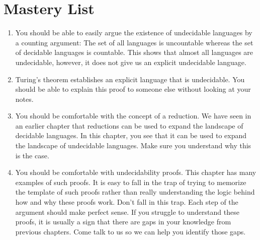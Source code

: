 
\section{Mastery List}

\begin{enumerate}
    \item You should be able to easily argue the existence of undecidable languages by a counting argument: The set of all languages is uncountable whereas the set of decidable languages is countable. This shows that almost all languages are undecidable, however, it does not give us an explicit undecidable language.
    \item Turing's theorem establishes an explicit language that is undecidable. You should be able to explain this proof to someone else without looking at your notes.
    \item You should be comfortable with the concept of a reduction. We have seen in an earlier chapter that reductions can be used to expand the landscape of decidable languages. In this chapter, you see that it can be used to expand the landscape of undecidable languages. Make sure you understand why this is the case.
    \item You should be comfortable with undecidability proofs. This chapter has many examples of such proofs. It is easy to fall in the trap of trying to memorize the template of such proofs rather than really understanding the logic behind how and why these proofs work. Don't fall in this trap. Each step of the argument should make perfect sense. If you struggle to understand these proofs, it is usually a sign that there are gaps in your knowledge from previous chapters. Come talk to us so we can help you identify those gaps.
\end{enumerate}
